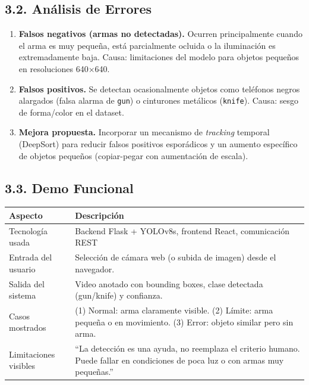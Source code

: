 \documentclass[12pt, letterpaper]{article}
\begin{document}
\subsection{3.2. Análisis de Errores}

\begin{enumerate}
    \item \textbf{Falsos negativos (armas no detectadas).} Ocurren principalmente cuando el arma es muy pequeña, está parcialmente ocluida o la iluminación es extremadamente baja. Causa: limitaciones del modelo para objetos pequeños en resoluciones 640$\times$640.
    \item \textbf{Falsos positivos.} Se detectan ocasionalmente objetos como teléfonos negros alargados (falsa alarma de \texttt{gun}) o cinturones metálicos (\texttt{knife}). Causa: sesgo de forma/color en el dataset.
    \item \textbf{Mejora propuesta.} Incorporar un mecanismo de \textit{tracking} temporal (DeepSort) para reducir falsos positivos esporádicos y un aumento específico de objetos pequeños (copiar-pegar con aumentación de escala).
\end{enumerate}

\subsection{3.3. Demo Funcional}

\begin{center}
\begin{tabular}{L{3.5cm} L{9.5cm}}
\toprule
\textbf{Aspecto} & \textbf{Descripción} \\
\midrule
Tecnología usada & Backend Flask + YOLOv8s, frontend React, comunicación REST \\
Entrada del usuario & Selección de cámara web (o subida de imagen) desde el navegador. \\
Salida del sistema & Video anotado con bounding boxes, clase detectada (gun/knife) y confianza. \\
Casos mostrados & (1) Normal: arma claramente visible. (2) Límite: arma pequeña o en movimiento. (3) Error: objeto similar pero sin arma. \\
Limitaciones visibles & ``La detección es una ayuda, no reemplaza el criterio humano. Puede fallar en condiciones de poca luz o con armas muy pequeñas.'' \\
\bottomrule
\end{tabular}
\end{center}
\end{document}
